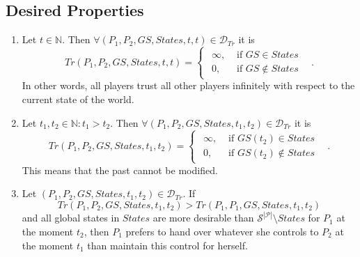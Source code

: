   \subsection{Desired Properties}
    \begin{enumerate}
      \item Let $t \in \mathbb{N}$. Then $\forall \left(P_1, P_2, GS, States, t, t\right) \in \mathcal{D}_{Tr}$ it is
      \begin{equation*}
        Tr\left(P_1, P_2, GS, States, t, t\right) =
	\begin{cases}
	\begin{aligned}
	  \infty, & \mbox{ if } GS \in States \\
          0, & \mbox{ if } GS \notin States
	\end{aligned}
	\end{cases} \enspace.
      \end{equation*}
      In other words, all players trust all other players infinitely with respect to the current state of the world.

      \item Let $t_1, t_2 \in \mathbb{N}: t_1 > t_2$. Then $\forall \left(P_1, P_2, GS, States, t_1, t_2\right) \in
      \mathcal{D}_{Tr}$ it is
      \begin{equation*}
        Tr\left(P_1, P_2, GS, States, t_1, t_2\right) =
	\begin{cases}
	\begin{aligned}
	  \infty, & \mbox{ if } GS\left(t_2\right) \in States \\
          0, & \mbox{ if } GS\left(t_2\right) \notin States
	\end{aligned}
	\end{cases} \enspace.
      \end{equation*}
      This means that the past cannot be modified.

      \item Let $\left(P_1, P_2, GS, States, t_1, t_2\right) \in \mathcal{D}_{Tr}$. If 
      \begin{equation*}
        Tr\left(P_1, P_2, GS, States, t_1, t_2\right) > Tr\left(P_1, P_1, GS, States, t_1, t_2\right)
      \end{equation*}
      and all global states in $States$ are more desirable than $\mathcal{S}^{|\mathcal{P}|} \setminus States$ for $P_1$ at
      the moment $t_2$, then $P_1$ prefers to hand over whatever she controls to $P_2$ at the moment $t_1$ than maintain this
      control for herself.


\end{enumerate}
